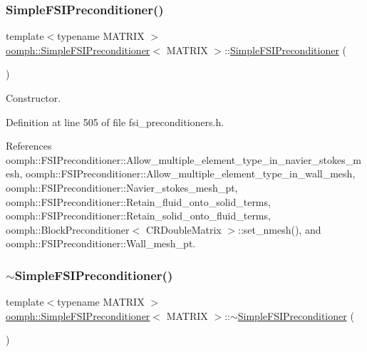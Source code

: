\subsubsection{\texorpdfstring{Simple\+F\+S\+I\+Preconditioner()}{SimpleFSIPreconditioner()}\hspace{0.1cm}{\footnotesize\ttfamily [1/2]}}
{\footnotesize\ttfamily template$<$typename M\+A\+T\+R\+IX $>$ \\
\hyperlink{classoomph_1_1SimpleFSIPreconditioner}{oomph\+::\+Simple\+F\+S\+I\+Preconditioner}$<$ M\+A\+T\+R\+IX $>$\+::\hyperlink{classoomph_1_1SimpleFSIPreconditioner}{Simple\+F\+S\+I\+Preconditioner} (\begin{DoxyParamCaption}{ }\end{DoxyParamCaption})\hspace{0.3cm}{\ttfamily [inline]}}



Constructor. 



Definition at line 505 of file fsi\+\_\+preconditioners.\+h.



References oomph\+::\+F\+S\+I\+Preconditioner\+::\+Allow\+\_\+multiple\+\_\+element\+\_\+type\+\_\+in\+\_\+navier\+\_\+stokes\+\_\+mesh, oomph\+::\+F\+S\+I\+Preconditioner\+::\+Allow\+\_\+multiple\+\_\+element\+\_\+type\+\_\+in\+\_\+wall\+\_\+mesh, oomph\+::\+F\+S\+I\+Preconditioner\+::\+Navier\+\_\+stokes\+\_\+mesh\+\_\+pt, oomph\+::\+F\+S\+I\+Preconditioner\+::\+Retain\+\_\+fluid\+\_\+onto\+\_\+solid\+\_\+terms, oomph\+::\+F\+S\+I\+Preconditioner\+::\+Retain\+\_\+solid\+\_\+onto\+\_\+fluid\+\_\+terms, oomph\+::\+Block\+Preconditioner$<$ C\+R\+Double\+Matrix $>$\+::set\+\_\+nmesh(), and oomph\+::\+F\+S\+I\+Preconditioner\+::\+Wall\+\_\+mesh\+\_\+pt.

\mbox{\label{classoomph_1_1SimpleFSIPreconditioner_a86515bb32fe8a2cdffda1d185751109d}} 
\subsubsection{\texorpdfstring{$\sim$\+Simple\+F\+S\+I\+Preconditioner()}{~SimpleFSIPreconditioner()}}
{\footnotesize\ttfamily template$<$typename M\+A\+T\+R\+IX $>$ \\
\hyperlink{classoomph_1_1SimpleFSIPreconditioner}{oomph\+::\+Simple\+F\+S\+I\+Preconditioner}$<$ M\+A\+T\+R\+IX $>$\+::$\sim$\hyperlink{classoomph_1_1SimpleFSIPreconditioner}{Simple\+F\+S\+I\+Preconditioner} (\begin{DoxyParamCaption}{ }\end{DoxyParamCaption})\hspace{0.3cm}{\ttfamily [inline]}}



